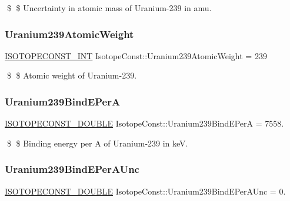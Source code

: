 \$ \$ Uncertainty in atomic mass of Uranium-\/239 in amu. \mbox{\label{group___isotope_const-_uranium-_u239_gaeecaf8313d752aeff858a93862df791b}} 
\subsubsection{\texorpdfstring{Uranium239\+Atomic\+Weight}{Uranium239AtomicWeight}}
{\footnotesize\ttfamily \mbox{\hyperlink{group___isotope_const-_macros_ga5f18360b3e99483a35c32d789e62621c}{I\+S\+O\+T\+O\+P\+E\+C\+O\+N\+S\+T\+\_\+\+I\+NT}} Isotope\+Const\+::\+Uranium239\+Atomic\+Weight = 239}

\$ \$ Atomic weight of Uranium-\/239. \mbox{\label{group___isotope_const-_uranium-_u239_gab18a76cd79ba4233da2ca3d5a21d53dc}} 
\subsubsection{\texorpdfstring{Uranium239\+Bind\+E\+PerA}{Uranium239BindEPerA}}
{\footnotesize\ttfamily \mbox{\hyperlink{group___isotope_const-_macros_ga8f45a7272ce02c0b4c65c44636ed719a}{I\+S\+O\+T\+O\+P\+E\+C\+O\+N\+S\+T\+\_\+\+D\+O\+U\+B\+LE}} Isotope\+Const\+::\+Uranium239\+Bind\+E\+PerA = 7558.}

\$ \$ Binding energy per A of Uranium-\/239 in keV. \mbox{\label{group___isotope_const-_uranium-_u239_gab3dc44440c6fa0f3f7d2cc750df831fa}} 
\subsubsection{\texorpdfstring{Uranium239\+Bind\+E\+Per\+A\+Unc}{Uranium239BindEPerAUnc}}
{\footnotesize\ttfamily \mbox{\hyperlink{group___isotope_const-_macros_ga8f45a7272ce02c0b4c65c44636ed719a}{I\+S\+O\+T\+O\+P\+E\+C\+O\+N\+S\+T\+\_\+\+D\+O\+U\+B\+LE}} Isotope\+Const\+::\+Uranium239\+Bind\+E\+Per\+A\+Unc = 0.}

